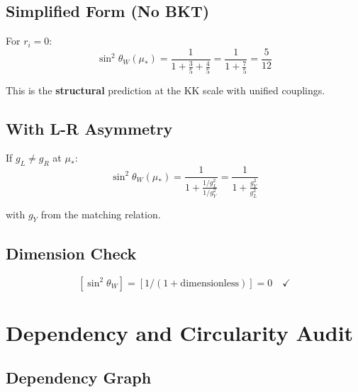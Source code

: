 \documentclass[11pt,a4paper]{article}
\begin{document}
\subsection{Simplified Form (No BKT)}
\label{subsec:simplified}

For $r_i = 0$:
\begin{equation}
\label{eq:sin2-no-bkt}
\sin^2\theta_W(\mu_*) = \frac{1}{1 + \frac{3}{5} + \frac{4}{5}} = \frac{1}{1 + \frac{7}{5}} = \frac{5}{12}
\end{equation}

This is the \textbf{structural} prediction at the KK scale with unified couplings.

\subsection{With L-R Asymmetry}
\label{subsec:lr-asymmetry}

If $g_L \neq g_R$ at $\mu_*$:
\begin{equation}
\label{eq:sin2-lr-asymm}
\sin^2\theta_W(\mu_*) = \frac{1}{1 + \frac{1/g_L^2}{1/g_Y^2}}
= \frac{1}{1 + \frac{g_Y^2}{g_L^2}}
\end{equation}

with $g_Y$ from the matching relation.

\subsection{Dimension Check}
\label{subsec:dim-check-closure}

\begin{equation}
\label{eq:sin2-dim}
[\sin^2\theta_W] = [1/(1 + \text{dimensionless})] = 0 \quad \checkmark
\end{equation}

\section{Dependency and Circularity Audit}
\label{sec:circularity}

\subsection{Dependency Graph}
\label{subsec:dep-graph}
\end{document}
